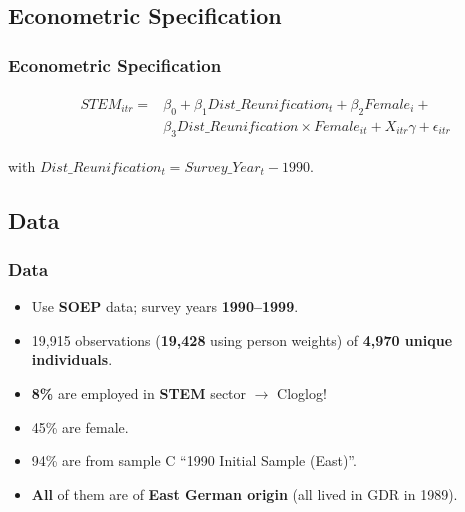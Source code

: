 \documentclass[11pt, aspectratio=1610, xcolor={dvipsnames}]{beamer}
\newcommand{\highlight}[1]{\textbf{\textcolor{PineGreen}{#1}}}
\begin{document}
	\subsection{Econometric Specification}
	\begin{frame}
		\frametitle{Econometric Specification}
		
			{\linespread{1}\normalsize
				\begin{align}
					&\begin{aligned}
						\label{eq:spec}
						STEM_{itr} =& \beta_{0} + \beta_{1} Dist\_Reunification_{t} + \beta_{2} Female_{i} +\\
						&\beta_{3} Dist\_Reunification \times Female_{it} + X_{itr} \gamma + \epsilon_{itr}
					\end{aligned}
				\end{align}
				
				\vspace{1cm}
				
				\hspace{6.2em} with $Dist\_Reunification_{t} = Survey\_Year_{t} - 1990$.
			}
		
	\end{frame}
	
	\subsection{Data}
	\begin{frame}
		\frametitle{Data}
		
		\begin{itemize}
			\item Use \highlight{SOEP} data; survey years \highlight{1990--1999}.
			\item 19,915 observations (\highlight{19,428} using person weights) of \highlight{4,970 unique individuals}.
			\item \highlight{8\%} are employed in \highlight{STEM} sector $\longrightarrow$ Cloglog!
			\item 45\% are female.
			\item 94\% are from sample C ``1990 Initial Sample (East)''.
			\item \highlight{All} of them are of \highlight{East German origin} (all lived in GDR in 1989).
		\end{itemize}
		
	\end{frame}
	
\end{document}
